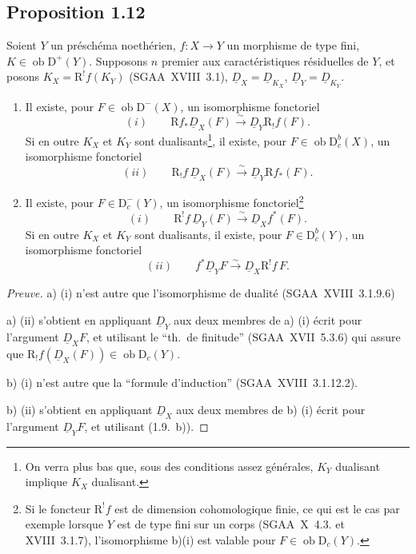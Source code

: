\documentclass[11pt]{article}
\newcommand{\R}{\mathrm{R}}
\newcommand{\D}{\mathrm{D}}
\newcommand{\ob}{\operatorname{ob}}
\providecommand{\ob}{\operatorname{ob}}
\providecommand{\R}{\mathrm R}
\begin{document}
\subsection*{Proposition 1.12}
Soient $Y$ un préschéma noethérien, $f : X \to Y$ un morphisme de type fini, $K \in \ob \D^{+}(Y)$. Supposons $n$ premier aux caractéristiques résiduelles de $Y$, et posons $K_X = \R^{!}f(K_Y)$ (SGAA~XVIII~3.1), $\underline{D}_X = \underline{D}_{K_X}$, $\underline{D}_Y = \underline{D}_{K_Y}$.
\begin{enumerate}
\item[a)] Il existe, pour $F \in \ob \D^{-}(X)$, un isomorphisme fonctoriel
\[
(i) \qquad \R f_{*} \underline{D}_X(F) \xrightarrow{\sim} \underline{D}_Y \R_{!}f(F).
\]
Si en outre $K_X$ et $K_Y$ sont dualisants\footnote{On verra plus bas que, sous des conditions assez générales, $K_Y$ dualisant implique $K_X$ dualisant.}, il existe, pour $F \in \ob \D_c^{b}(X)$, un isomorphisme fonctoriel
\[
(ii) \qquad \R_{!}f \, \underline{D}_X(F) \xrightarrow{\sim} \underline{D}_Y \R f_{*}(F).
\]
\item[b)] Il existe, pour $F \in \D_c^{-}(Y)$, un isomorphisme fonctoriel\footnote{Si le foncteur $\R^{!}f$ est de dimension cohomologique finie, ce qui est le cas par exemple lorsque $Y$ est de type fini sur un corps (SGAA~X~4.3. et XVIII~3.1.7), l'isomorphisme b)(i) est valable pour $F \in \ob \D_c(Y)$.}
\[
(i) \qquad \R^{!}f \, \underline{D}_Y(F) \xrightarrow{\sim} \underline{D}_X f^{*}(F).
\]
Si en outre $K_X$ et $K_Y$ sont dualisants\footnotemark[3], il existe, pour $F \in \D_c^{b}(Y)$, un isomorphisme fonctoriel
\[
(ii) \qquad f^{*} \underline{D}_Y F \xrightarrow{\sim} \underline{D}_X \R^{!}f \, F.
\]
\end{enumerate}

\begin{proof}[Preuve]
a) (i) n'est autre que l'isomorphisme de dualité (SGAA~XVIII~3.1.9.6)

a) (ii) s'obtient en appliquant $\underline{D}_Y$ aux deux membres de a) (i) écrit pour l'argument $\underline{D}_X F$, et utilisant le ``th.~de finitude'' (SGAA~XVII~5.3.6) qui assure que $\R_{!}f(\underline{D}_X(F)) \in \ob \D_c(Y)$.

b) (i) n'est autre que la ``formule d'induction'' (SGAA~XVIII~3.1.12.2).

b) (ii) s'obtient en appliquant $\underline{D}_X$ aux deux membres de b) (i) écrit pour l'argument $\underline{D}_Y F$, et utilisant (1.9.~b)).
\end{proof}
\end{document}
